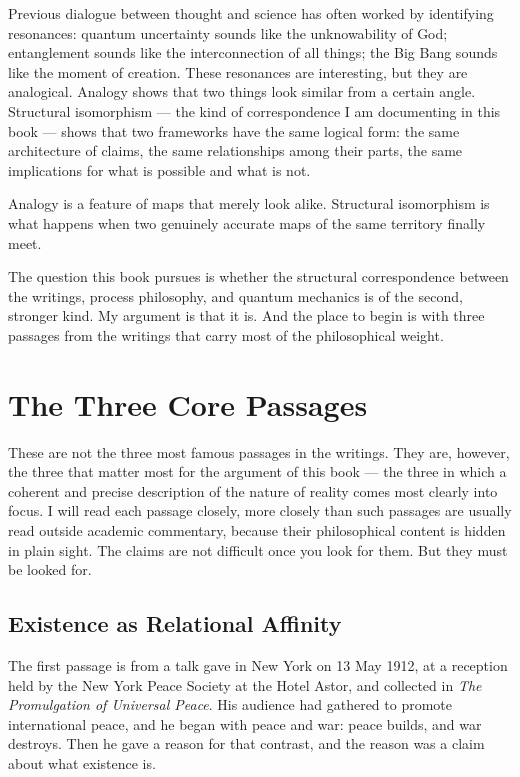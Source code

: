 Previous dialogue between \bahai thought and science has often worked by
identifying resonances: quantum uncertainty sounds like the unknowability of
God; entanglement sounds like the interconnection of all things; the Big Bang
sounds like the moment of creation.
These resonances are interesting, but they are analogical.
Analogy shows that two things look similar from a certain angle.
Structural isomorphism --- the kind of correspondence I am documenting in
this book --- shows that two frameworks have the same logical form: the same
architecture of claims, the same relationships among their parts, the same
implications for what is possible and what is not.

Analogy is a feature of maps that merely look alike.
Structural isomorphism is what happens when two genuinely accurate maps
of the same territory finally meet.

The question this book pursues is whether the structural correspondence
between the \bahai writings, process philosophy, and quantum mechanics
is of the second, stronger kind.
My argument is that it is.
And the place to begin is with three passages from the writings
that carry most of the philosophical weight.

\section{The Three Core Passages}
\label{sec:ch3-passages}

These are not the three most famous passages in the \bahai writings.
They are, however, the three that matter most for the argument of this book ---
the three in which a coherent and precise description of the nature of
reality comes most clearly into focus.
I will read each passage closely, more closely than such passages are
usually read outside academic commentary, because their philosophical
content is hidden in plain sight.
The claims are not difficult once you look for them.
But they must be looked for.

\subsection{Existence as Relational Affinity}
\label{subsec:ch3-passage1}

The first passage is from a talk \AbdulBaha gave in New York on 13 May 1912,
at a reception held by the New York Peace Society at the Hotel Astor, and
collected in \textit{The Promulgation of Universal Peace}.
His audience had gathered to promote international peace, and he began with
peace and war: peace builds, and war destroys.
Then he gave a reason for that contrast, and the reason was a claim about
what existence is.

